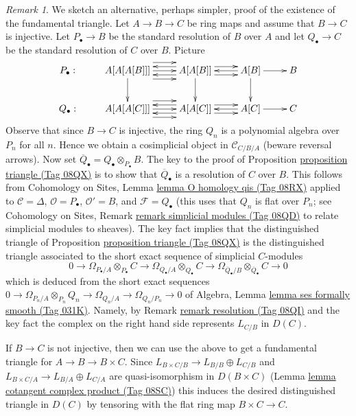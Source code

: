 \documentclass{amsart}
\theoremstyle{plain}
\theoremstyle{definition}
\theoremstyle{remark}
\newtheorem{remark}[subsection]{Remark}
\numberwithin{equation}{subsection}
\begin{document}
\begin{remark}
\label{remark-triangle}
We sketch an alternative, perhaps simpler, proof of the existence of
the fundamental triangle.
Let $A \to B \to C$ be ring maps and assume that $B \to C$ is injective.
Let $P_\bullet \to B$ be the standard resolution of $B$ over $A$ and
let $Q_\bullet \to C$ be the standard resolution of $C$ over $B$.
Picture
$$
\xymatrix{
P_\bullet : &
A[A[A[B]]] \ar[d]
\ar@<2ex>[r]
\ar@<0ex>[r]
\ar@<-2ex>[r]
&
A[A[B]] \ar[d]
\ar@<1ex>[r]
\ar@<-1ex>[r]
\ar@<1ex>[l]
\ar@<-1ex>[l]
&
A[B] \ar[d] \ar@<0ex>[l] \ar[r] &
B \\
Q_\bullet : &
A[A[A[C]]]
\ar@<2ex>[r]
\ar@<0ex>[r]
\ar@<-2ex>[r]
&
A[A[C]]
\ar@<1ex>[r]
\ar@<-1ex>[r]
\ar@<1ex>[l]
\ar@<-1ex>[l]
&
A[C] \ar@<0ex>[l] \ar[r] &
C
}
$$
Observe that since $B \to C$ is injective, the ring $Q_n$ is a
polynomial algebra over $P_n$ for all $n$. Hence we obtain a cosimplicial
object in $\mathcal{C}_{C/B/A}$ (beware reversal arrows).
Now set $\overline{Q}_\bullet = Q_\bullet \otimes_{P_\bullet} B$.
The key to the proof of Proposition \href{https://stacks.math.columbia.edu/tag/08QX}{proposition triangle (Tag 08QX)}
is to show that $\overline{Q}_\bullet$ is a resolution of $C$ over $B$.
This follows from Cohomology on Sites, Lemma
\href{https://stacks.math.columbia.edu/tag/08RX}{lemma O homology qis (Tag 08RX)}
applied to $\mathcal{C} = \Delta$, $\mathcal{O} = P_\bullet$,
$\mathcal{O}' = B$, and $\mathcal{F} = Q_\bullet$ (this uses that $Q_n$
is flat over $P_n$; see Cohomology on Sites, Remark
\href{https://stacks.math.columbia.edu/tag/08QD}{remark simplicial modules (Tag 08QD)} to relate simplicial modules
to sheaves). The key fact implies that the distinguished triangle of
Proposition \href{https://stacks.math.columbia.edu/tag/08QX}{proposition triangle (Tag 08QX)}
is the distinguished triangle associated to the short exact sequence
of simplicial $C$-modules
$$
0 \to
\Omega_{P_\bullet/A} \otimes_{P_\bullet} C \to
\Omega_{Q_\bullet/A} \otimes_{Q_\bullet} C \to
\Omega_{\overline{Q}_\bullet/B} \otimes_{\overline{Q}_\bullet} C \to 0
$$
which is deduced from the short exact sequences
$0 \to \Omega_{P_n/A} \otimes_{P_n} Q_n \to \Omega_{Q_n/A} \to
\Omega_{Q_n/P_n} \to 0$ of
Algebra, Lemma \href{https://stacks.math.columbia.edu/tag/031K}{lemma ses formally smooth (Tag 031K)}.
Namely, by Remark \href{https://stacks.math.columbia.edu/tag/08QI}{remark resolution (Tag 08QI)} and the key fact the complex on the
right hand side represents $L_{C/B}$ in $D(C)$.

\medskip\noindent
If $B \to C$ is not injective, then we can use the above to get a
fundamental triangle for $A \to B \to B \times C$. Since
$L_{B \times C/B} \to L_{B/B} \oplus L_{C/B}$ and
$L_{B \times C/A} \to L_{B/A} \oplus L_{C/A}$
are quasi-isomorphism in $D(B \times C)$
(Lemma \href{https://stacks.math.columbia.edu/tag/08SC}{lemma cotangent complex product (Tag 08SC)})
this induces the desired distinguished triangle in $D(C)$
by tensoring with the flat ring map $B \times C \to C$.
\end{remark}
\end{document}

